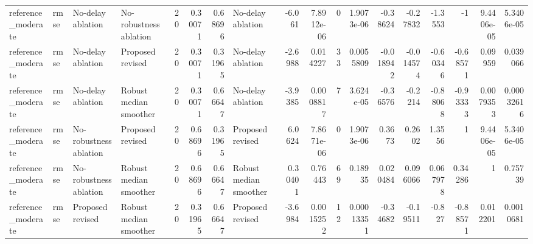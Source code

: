 \begin{table}[!htbp]
{\begin{tabular}{llllrrrlrrrrrrrrrr}
reference_moderate & rmse & No-delay ablation & No-robustness ablation & 20 & 0.30071 & 0.68696 & No-delay ablation & -6.061 & 7.8912e-06 & 0 & 1.9073e-06 & -0.38624 & -0.27832 & -1.3553 & -1 & 9.4406e-05 & 5.3406e-05 \\
reference_moderate & rmse & No-delay ablation & Proposed revised & 20 & 0.30071 & 0.31965 & No-delay ablation & -2.6988 & 0.014227 & 33 & 0.0055809 & -0.018942 & -0.014574 & -0.60346 & -0.68571 & 0.09959 & 0.039066 \\
reference_moderate & rmse & No-delay ablation & Robust median smoother & 20 & 0.30071 & 0.66647 & No-delay ablation & -3.9385 & 0.0008817 & 7 & 3.624e-05 & -0.36576 & -0.2214 & -0.88068 & -0.93333 & 0.0079353 & 0.00032616 \\
reference_moderate & rmse & No-robustness ablation & Proposed revised & 20 & 0.68696 & 0.31965 & Proposed revised & 6.0624 & 7.8671e-06 & 0 & 1.9073e-06 & 0.3673 & 0.2602 & 1.3556 & 1 & 9.4406e-05 & 5.3406e-05 \\
reference_moderate & rmse & No-robustness ablation & Robust median smoother & 20 & 0.68696 & 0.66647 & Robust median smoother & 0.30401 & 0.76443 & 69 & 0.18935 & 0.020484 & 0.096066 & 0.067978 & 0.34286 & 1 & 0.75739 \\
reference_moderate & rmse & Proposed revised & Robust median smoother & 20 & 0.31965 & 0.66647 & Proposed revised & -3.6984 & 0.0015252 & 12 & 0.00013351 & -0.34682 & -0.19511 & -0.827 & -0.88571 & 0.012201 & 0.0010681 \\
\bottomrule
\end{tabular}
}
\end{table}
